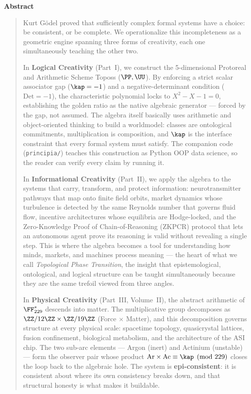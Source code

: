 \begin{center}\textbf{Abstract}\end{center}\begin{quotation}
Kurt G\"odel proved that sufficiently complex formal systems have a choice: be consistent, or be complete. We operationalize this incompleteness as a geometric engine spanning three forms of creativity, each one simultaneously teaching the other two.

In \textbf{Logical Creativity} (Part~I), we construct the 5-dimensional Protoreal and Arithmetic Scheme Toposs ($\PP, \UU$). By enforcing a strict scalar associator gap ($\kap = -1$) and a negative-determinant condition ($\mathrm{Det} = -1$), the characteristic polynomial locks to $X^2 - X - 1 = 0$, establishing the golden ratio as the native algebraic generator --- forced by the gap, not assumed. The algebra itself basically uses arithmetic and object-oriented thinking to build a worldmodel: classes are ontological commitments, multiplication is composition, and $\kap$ is the interface constraint that every formal system must satisfy. The companion code (\texttt{principia/}) teaches this construction as Python OOP data science, so the reader can verify every claim by running it.

In \textbf{Informational Creativity} (Part~II), we apply the algebra to the systems that carry, transform, and protect information: neurotransmitter pathways that map onto finite field orbits, market dynamics whose turbulence is detected by the same Reynolds number that governs fluid flow, incentive architectures whose equilibria are Hodge-locked, and the Zero-Knowledge Proof of Chain-of-Reasoning (ZKPCR) protocol that lets an autonomous agent prove its reasoning is valid without revealing a single step. This is where the algebra becomes a tool for understanding how minds, markets, and machines process meaning --- the heart of what we call \emph{Topological Phase Transition}, the insight that epistemological, ontological, and logical structure can be taught simultaneously because they are the same trefoil viewed from three angles.

In \textbf{Physical Creativity} (Part~III, Volume~II), the abstract arithmetic of $\FF_{229}^*$ descends into matter. The multiplicative group decomposes as $\ZZ/12\ZZ \times \ZZ/19\ZZ$ (Force $\times$ Matter), and this decomposition governs structure at every physical scale: spacetime topology, quasicrystal lattices, fusion confinement, biological metabolism, and the architecture of the ASI chip. The two sub-arc elements --- Argon (inert) and Actinium (unstable) --- form the observer pair whose product $\mathrm{Ar} \times \mathrm{Ac} \equiv \kap \pmod{229}$ closes the loop back to the algebraic hole. The system is \textbf{epi-consistent}: it is consistent about where its own consistency breaks down, and that structural honesty is what makes it buildable.


\end{quotation}
